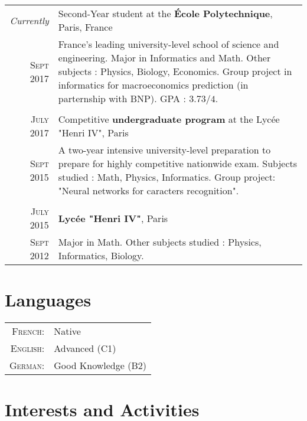 \documentclass[a4paper,10pt]{article} %
\begin{document}
\begin{tabularx}{\linewidth}{r|X}
\emph{Currently} & Second-Year student at the \textbf{École Polytechnique}, Paris, France \\
\textsc{Sept} 2017 & \small{France’s leading university-level school of science and engineering.
Major in Informatics and Math. Other subjects : Physics, Biology, Economics.
Group project in informatics for macroeconomics prediction (in parternship with BNP).
GPA : $3.73/4$.}
\\ & \\

\textsc{July 2017} & Competitive \textbf{undergraduate program} at the Lycée "Henri IV", Paris\\
\textsc{Sept 2015} & \small{A two-year intensive university-level preparation
to prepare for highly competitive nationwide exam.
Subjects studied : Math, Physics, Informatics. Group project: "Neural networks for caracters recognition".}
\\&\\

\textsc{July 2015} & \textbf{Lycée "Henri IV"}, Paris\\
\textsc{Sept 2012} & \small{Major in Math. Other subjects studied : Physics, Informatics, Biology.}
\end{tabularx}


\section{Languages}

\begin{tabular}{rl}
  \textsc{French:} & Native \\
  \textsc{English:} & Advanced (C1)\\
  \textsc{German:} & Good Knowledge (B2)\\
\end{tabular}


\section{Interests and Activities}
\end{document}
